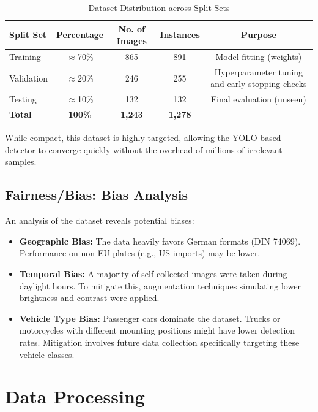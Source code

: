 \begin{table}[htbp]
	\centering
	\caption{Dataset Distribution across Split Sets}
	\label{tab:dataset_split}
	\begin{tabular}{@{}lcccc@{}}
		\toprule
		\textbf{Split Set} & \textbf{Percentage} & \textbf{No. of Images} & \textbf{Instances} & \textbf{Purpose} \\ \midrule
		Training & $\approx$70\% & 865 & 891 & Model fitting (weights) \\
		Validation & $\approx$20\% & 246 & 255 & Hyperparameter tuning and early stopping checks \\
		Testing & $\approx$10\% & 132 & 132 & Final evaluation (unseen) \\ \midrule
		\textbf{Total} & \textbf{100\%} & \textbf{1,243} & \textbf{1,278} & \\ \bottomrule
	\end{tabular}
\end{table}

While compact, this dataset is highly targeted, allowing the YOLO-based detector to converge quickly without the overhead of millions of irrelevant samples.

\subsection{Fairness/Bias: Bias Analysis}
An analysis of the dataset reveals potential biases:
\begin{itemize}
	\item \textbf{Geographic Bias:} The data heavily favors German formats (DIN 74069). Performance on non-EU plates (e.g., US imports) may be lower.
	\item \textbf{Temporal Bias:} A majority of self-collected images were taken during daylight hours. To mitigate this, augmentation techniques simulating lower brightness and contrast were applied.
	\item \textbf{Vehicle Type Bias:} Passenger cars dominate the dataset. Trucks or motorcycles with different mounting positions might have lower detection rates. Mitigation involves future data collection specifically targeting these vehicle classes.
\end{itemize}

\section{Data Processing}
\label{subsec:data_processing}

